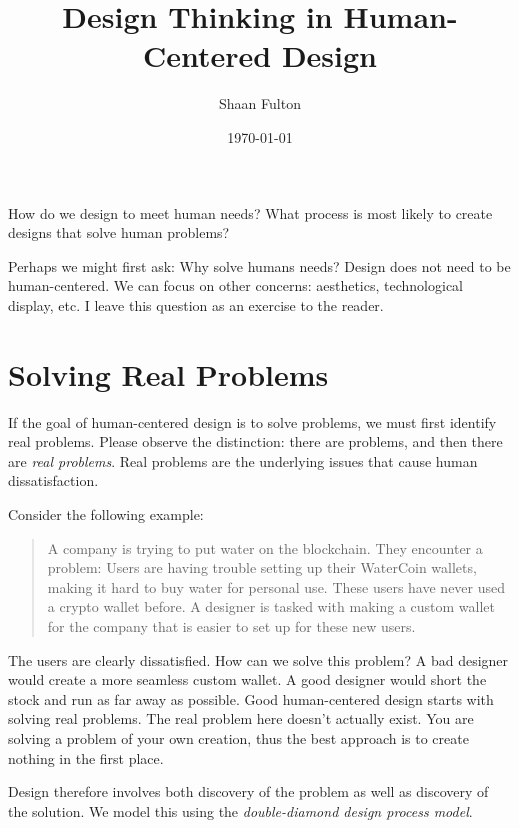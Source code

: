 \documentclass[12pt]{article}
\title{Design Thinking in Human-Centered Design}
\author{Shaan Fulton}
\date{\today}
\begin{document}
\maketitle

How do we design to meet human needs? What process is most likely to create designs that solve human problems?

Perhaps we might first ask: Why solve humans needs? Design does not need to be human-centered. We can focus on other concerns: aesthetics, technological display, etc. I leave this question as an exercise to the reader.

\section*{Solving Real Problems}

If the goal of human-centered design is to solve problems, we must first identify real problems. Please observe the distinction: there are problems, and then there are \textit{real problems}. Real problems are the underlying issues that cause human dissatisfaction.

Consider the following example:

\begin{quote}
A company is trying to put water on the blockchain. They encounter a problem: Users are having trouble setting up their WaterCoin wallets, making it hard to buy water for personal use. These users have never used a crypto wallet before. A designer is tasked with making a custom wallet for the company that is easier to set up for these new users.
\end{quote}

The users are clearly dissatisfied. How can we solve this problem? A bad designer would create a more seamless custom wallet. A good designer would short the stock and run as far away as possible. Good human-centered design starts with solving real problems. The real problem here doesn't actually exist. You are solving a problem of your own creation, thus the best approach is to create nothing in the first place.

Design therefore involves both discovery of the problem as well as discovery of the solution. We model this using the \textit{double-diamond design process model}.
\end{document}
